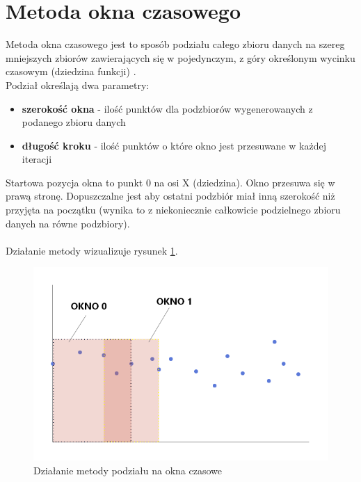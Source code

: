 \documentclass[eng,printmode]{mgr}
\begin{document}
\section{Metoda okna czasowego}
Metoda okna czasowego jest to sposób podziału całego zbioru danych na szereg mniejszych zbiorów zawierających się w pojedynczym, z góry określonym wycinku czasowym (dziedzina funkcji) \cite{windowing}.\\
Podział określają dwa parametry:
\begin{itemize}
\item \textbf{szerokość okna} - ilość punktów dla podzbiorów wygenerowanych z podanego zbioru danych
\item \textbf{długość kroku} - ilość punktów o które okno jest przesuwane w każdej iteracji
\end{itemize}

Startowa pozycja okna to punkt 0 na osi X (dziedzina). Okno przesuwa się w prawą stronę. Dopuszczalne jest aby ostatni podzbiór miał inną szerokość niż przyjęta na początku (wynika to z niekoniecznie całkowicie podzielnego zbioru danych na równe podzbiory).
\\ \\
Działanie metody wizualizuje rysunek \ref{fig:okno_czasowe}.

\begin{figure}[H]
  \begin{center}
  \includegraphics[scale=0.7]{okno_czasowe}
  \end{center}
  \caption{Działanie metody podziału na okna czasowe}
  \label{fig:okno_czasowe}
\end{figure}
\end{document}
